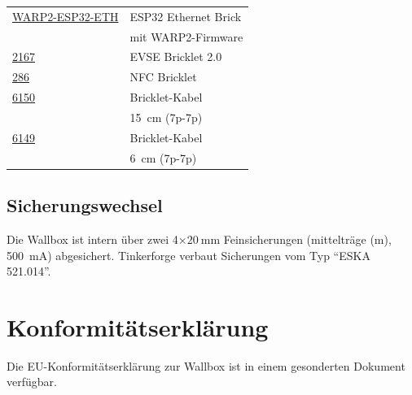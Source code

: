 \documentclass[a4paper,10pt]{article}
\begin{document}
\begin{multicols*}{2}
\begin{tabular}{ll}
		\cmidrule(lr{0.5em}){1-2}
		\href{https://www.tinkerforge.com/de/shop/warp/warp2-spare-parts/warp2-esp32-eth.html}{WARP2-ESP32-ETH}	                    & ESP32 Ethernet Brick                 \\
		                                                                                                                            & mit WARP2-Firmware                   \\
		\cmidrule(lr{0.5em}){1-2}
		\href{https://www.tinkerforge.com/de/shop/warp/warp2-spare-parts/evse-v2-bricklet.html}{2167}                               & EVSE Bricklet 2.0                    \\
		\cmidrule(lr{0.5em}){1-2}
		\href{https://www.tinkerforge.com/de/shop/warp/warp2-spare-parts/nfc-bricklet.html}{286}                                    & NFC Bricklet                         \\
		\cmidrule(lr{0.5em}){1-2}
		\href{https://www.tinkerforge.com/de/shop/accessories/cable/bricklet-cable-15cm-7p-7p.html}{6150}                           & Bricklet-Kabel                       \\
		                                                                                                                            & \SI{15}{\centi\meter} (7p-7p)        \\
		\cmidrule(lr{0.5em}){1-2}
		\href{https://www.tinkerforge.com/de/shop/accessories/cable/bricklet-cable-6cm-7p-7p.html}{6149}                            & Bricklet-Kabel                       \\
		                                                                                                                            & \SI{6}{\centi\meter} (7p-7p)         \\
	\end{tabular}

	\subsection{Sicherungswechsel}
	Die Wallbox ist intern über zwei 4$\times\SI{20}{\milli\meter}$ Feinsicherungen (mittelträge (m), \SI{500}{\milli\ampere}) abgesichert.
	Tinkerforge verbaut Sicherungen vom Typ \enquote{ESKA 521.014}.

	\section{Konformitätserklärung}
	Die EU-Konformitätserklärung zur Wallbox ist in einem gesonderten Dokument verfügbar.


\end{multicols*}
\end{document}
